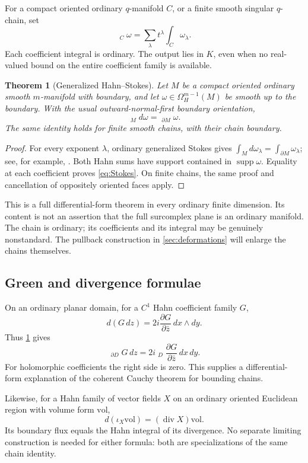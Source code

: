 \documentclass[11pt,letterpaper]{article}
\newtheorem{theorem}{Theorem}[section]
\theoremstyle{definition}
\theoremstyle{remark}
\newcommand{\supp}{\operatorname{supp}}
\newcommand{\HInt}{\mathop{\int^{\!H}}\nolimits}
\newcommand{\HCoint}{\mathop{\oint^{\!H}}\nolimits}
\numberwithin{equation}{section}
\begin{document}
For a compact oriented ordinary $q$-manifold $C$, or a finite smooth singular $q$-chain, set
\[
\HInt_C\omega=\sum_\lambda t^\lambda\int_C\omega_\lambda.
\]
Each coefficient integral is ordinary. The output lies in $K$, even when no real-valued bound on the entire coefficient family is available.

\begin{theorem}[Generalized Hahn--Stokes]\label{thm:Stokes}
Let $M$ be a compact oriented ordinary smooth $m$-manifold with boundary, and let $\omega\in\Omega_H^{m-1}(M)$ be smooth up to the boundary. With the usual outward-normal-first boundary orientation,
\begin{equation}\label{eq:Stokes}
\boxed{\qquad \HInt_M d\omega=\HInt_{\partial M}\omega.\qquad}
\end{equation}
The same identity holds for finite smooth chains, with their chain boundary.
\end{theorem}
\begin{proof}
For every exponent $\lambda$, ordinary generalized Stokes gives
$\int_Md\omega_\lambda=\int_{\partial M}\omega_\lambda$; see, for example, \cite[Theorem 4.6.1]{GH}. Both Hahn sums have support contained in $\supp\omega$. Equality at each coefficient proves \eqref{eq:Stokes}. On finite chains, the same proof and cancellation of oppositely oriented faces apply.
\end{proof}
This is a full differential-form theorem in every ordinary finite dimension. Its content is not an assertion that the full surcomplex plane is an ordinary manifold. The chain is ordinary; its coefficients and its integral may be genuinely nonstandard. The pullback construction in \cref{sec:deformations} will enlarge the chains themselves.

\subsection{Green and divergence formulae}
On an ordinary planar domain, for a $C^1$ Hahn coefficient family $G$,
\[
d(G\,dz)=2i\frac{\partial G}{\partial\bar z}\,dx\wedge dy.
\]
Thus \cref{thm:Stokes} gives
\begin{equation}\label{eq:Green}
\HCoint_{\partial D}G\,dz
=2i\HInt_D\frac{\partial G}{\partial\bar z}\,dx\,dy.
\end{equation}
For holomorphic coefficients the right side is zero. This supplies a differential-form explanation of the coherent Cauchy theorem for bounding chains.

Likewise, for a Hahn family of vector fields $X$ on an ordinary oriented Euclidean region with volume form $\mathrm{vol}$,
\[
d(\iota_X\mathrm{vol})=(\operatorname{div}X)\mathrm{vol}.
\]
Its boundary flux equals the Hahn integral of its divergence. No separate limiting construction is needed for either formula: both are specializations of the same chain identity.
\end{document}
